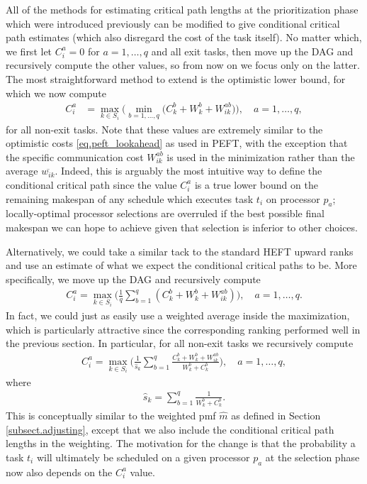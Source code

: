 \documentclass[12pt]{article}
\begin{document}
All of the methods for estimating critical path lengths at the prioritization phase which were introduced previously can be modified to give conditional critical path estimates (which also disregard the cost of the task itself). No matter which, we first let $C_i^a = 0$ for $a = 1, \dots, q$ and all exit tasks, then move up the DAG and recursively compute the other values, so from now on we focus only on the latter. The most straightforward method to extend is the optimistic lower bound, for which we now compute 
\begin{align}
C_i^a &= \max_{k \in S_i} \bigg( \min_{b = 1, \dots, q} \big( C_k^b + W_k^b + W_{ik}^{ab} \big)  \bigg), \quad a = 1, \dots, q, \label{eq.cia_min} 
\end{align}
for all non-exit tasks. Note that these values are extremely similar to the optimistic costs \eqref{eq.peft_lookahead} as used in PEFT, with the exception that the specific communication cost $W_{ik}^{ab}$ is used in the minimization rather than the average $\overline{w_{ik}}$. Indeed, this is arguably the most intuitive way to define the conditional critical path since the value $C_i^a$ is a true lower bound on the remaining makespan of any schedule which executes task $t_i$ on processor $p_a$; locally-optimal processor selections are overruled if the best possible final makespan we can hope to achieve given that selection is inferior to other choices.          

Alternatively, we could take a similar tack to the standard HEFT upward ranks and use an estimate of what we expect the conditional critical paths to be. More specifically, we move up the DAG and recursively compute 
\begin{align}
C_i^a = \max_{k \in S_i} \bigg( \frac{1}{q} \sum_{b = 1}^{q} (C_k^b + W_k^b + W_{ik}^{ab}) \bigg), \quad a = 1, \dots, q. \label{eq.cia_mean} 
\end{align} 
In fact, we could just as easily use a weighted average inside the maximization, which is particularly attractive since the corresponding ranking performed well in the previous section. In particular, for all non-exit tasks we recursively compute
\begin{align}
C_i^a = \max_{k \in S_i} \bigg( \frac{1}{\hat{s}_k} \sum_{b = 1}^{q} \frac{C_k^b + W_k^b + W_{ik}^{ab}}{W_k^b + C_k^b} \bigg), \quad a = 1, \dots, q, \label{eq.cia_weighted} 
\end{align}
where
\begin{align}
\hat{s}_k = \sum_{b = 1}^{q} \frac{1}{W_k^b + C_k^b}. \label{eq.s_hat}
\end{align} 
This is conceptually similar to the weighted pmf $\hat{m}$ as defined in Section \ref{subsect.adjusting}, except that we also include the conditional critical path lengths in the weighting. The motivation for the change is that the probability a task $t_i$ will ultimately be scheduled on a given processor $p_a$ at the selection phase now also depends on the $C_i^a$ value.  
\end{document}
